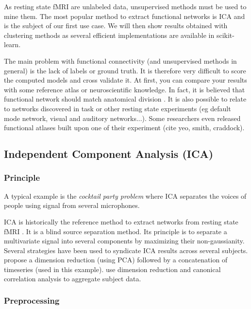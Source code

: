 \documentclass{frontiersSCNS} %
\newcommand{\alex}[1]{\todo[inline, color=green!40]{#1}}
\begin{document}
As resting state fMRI are unlabeled data, unsupervised methods must be used to
mine them. The most popular method to extract functional networks is ICA and
is the subject of our first use case. We will then show results obtained with
clustering methods as several efficient implementations are available in
scikit-learn.

The main problem with functional connectivity (and unsupervised methods in
general) is the lack of labels or ground truth. It is therefore very difficult
to score the computed models and cross validate it. At first, you can
compare your results with some reference atlas or neuroscientific knowledge. In
fact, it is believed that functional network should match anatomical division
\alex{Well, I believe that. Any reference ?}. It is also possible to relate to
networks discovered in task or other resting state experiments (eg default mode
network, visual and auditory networks...). Some researchers even released
functional atlases built upon one of their experiment (cite yeo, smith,
craddock).

\subsection{Independent Component Analysis (ICA)}

\subsubsection{Principle}

A typical example is the \emph{cocktail party problem} where ICA separates the
voices of people using signal from several microphones.

ICA is historically the reference method to extract networks from resting state
fMRI \cite{biswal1999}. It is a blind source separation method. Its principle is
to separate a
multivariate signal into several components by maximizing their non-gaussianity.
Several strategies have been used to syndicate ICA
results across several subjects. \cite{calhoun2001a} propose a dimension
reduction (using PCA) followed by a concatenation of timeseries (used in this
example).
\cite{varoquaux2010} use dimension reduction and canonical correlation analysis
to aggregate subject data.

\subsubsection{Preprocessing}
\end{document}
